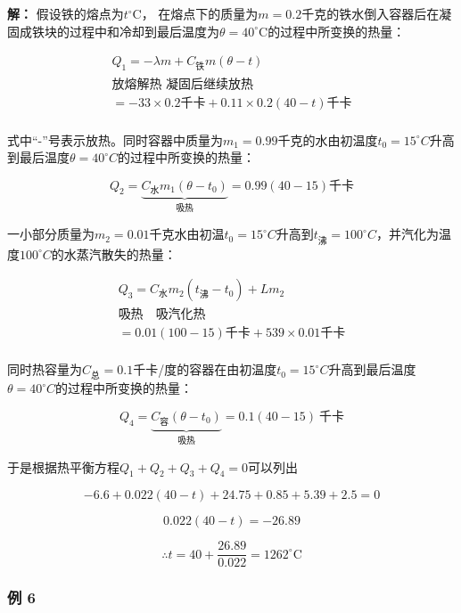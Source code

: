 \textbf{解：} 假设铁的熔点为\(t^{\circ}\mathrm{C}\)，
在熔点下的质量为\(m = 0.2\)千克的铁水倒入容器后在凝固成铁块的过程中和冷却到最后温度为\(\theta = 40^{\circ}\mathrm{C}\)的过程中所变换的热量：

\[
\begin{array}{l} Q _ {1} = - \lambda m + C _ {\text{铁}} m (\theta - t) \\ \text{放熔解热   凝固后继续放热} \\ = - 33 \times 0.2 \text{千卡} + 0.11 \times 0.2 (40 - t) \text{千卡} \\ \end{array}
\]

式中``-''号表示放热。同时容器中质量为\(m_{1}=0.99\)千克的水由初温度\(t_{0}=15^{\circ}C\)升高到最后温度\(\theta=40^{\circ}C\)的过程中所变换的热量：

\[
Q _ {2} = \underbrace {C _ {\text{水}} m _ {1} (\theta - t _ {0})} _ {\text{吸热}} = 0.99 (40 - 15) \text{千卡}
\]

一小部分质量为\(m_{2}=0.01\)千克水由初温\(t_{0}=15^{\circ}C\)升高到\(t_{\text{沸}}=100^{\circ}C\)，并汽化为温度\(100^{\circ}C\)的水蒸汽散失的热量：

\[
\begin{array}{l} Q _ {3} = C _ {\text{水}} m _ {2} (t _ {\text{沸}} - t _ {0}) + L m _ {2} \\ \text{吸热} \quad \text{吸汽化热} \\ = 0.01 (100 - 15) \text{千卡} + 539 \times 0.01 \text{千卡} \\ \end{array}
\]

同时热容量为\(C_{\text{总}}=0.1\)千卡/度的容器在由初温度\(t_{0}=15^{\circ}C\)升高到最后温度\(\theta=40^{\circ}C\)的过程中所变换的热量：

\[
Q_4=\underbrace{C_{\text{容}}(\theta-t_0)}_{\text{吸热}}=0.1(40-15)\ \text{千卡}
\]

于是根据热平衡方程\(Q_{1} + Q_{2} + Q_{3} + Q_{4} = 0\)可以列出

\[
- 6.6 + 0.022 (40 - t) + 24.75 + 0.85 + 5.39 + 2.5 = 0
\]

\[
0.022 (40 - t) = - 26.89
\]

\[
\therefore t = 40 + \frac {26.89}{0.022} = 1262 ^ {\circ} \mathrm{C}
\]

\subsubsection{例 6}\label{ux4f8b-6-3}

